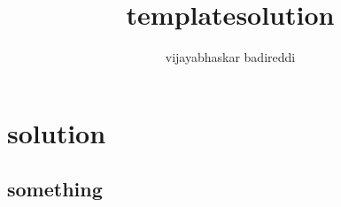 \documentclass[12pt] {article}
\title{templatesolution}
\author{vijayabhaskar badireddi}
\begin{document}
        
\section*{solution}
\subsection*{something}
\end{document}
